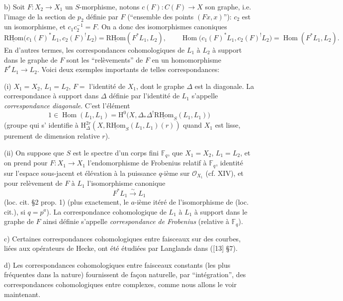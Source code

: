 \documentclass[11pt]{article}
\renewcommand{\H}{\mathrm{H}}
\DeclareMathOperator{\Hom}{Hom}
\newcommand{\R}{\mathrm{R}}\newcommand{\RHomCore}{\mathrm{RHom}}
\providecommand{\RHom}{\RHomCore}
\providecommand{\uRHom}{\underline{\RHom}}
\providecommand{\RHom}{\RHomCore}
\providecommand{\Hom}{\operatorname{Hom}}
\providecommand{\RHom}{\R\mathcal{H}om}
\providecommand{\R}{\mathrm R}
\providecommand{\RHom}{\RHomCore}
\providecommand{\Hom}{\operatorname{Hom}}
\begin{document}
b) Soit $F:X_2\to X_1$ un $S$-morphisme, notons $c(F):C(F)\to X$ son graphe, i.e. l'image de la section de $p_2$ définie par $F$ (``ensemble des points $(Fx,x)$''): $c_2$ est un isomorphisme, et $c_1c_2^{-1}=F$. On a donc des isomorphismes canoniques
\begin{equation}
\uRHom\bigl(c_1(F)^*L_1,c_2(F)^!L_2\bigr)=\uRHom(F^*L_1,L_2),
\qquad
\Hom\bigl(c_1(F)^*L_1,c_2(F)^!L_2\bigr)=\Hom(F^*L_1,L_2).
\tag{3.2.6}
\end{equation}
En d'autres termes, les correspondances cohomologiques de $L_1$ à $L_2$ à support dans le graphe de $F$ sont les ``relèvements'' de $F$ en un homomorphisme $F^*L_1\to L_2$. Voici deux exemples importants de telles correspondances:

(i) $X_1=X_2$, $L_1=L_2$, $F=$ l'identité de $X_1$, dont le graphe $\Delta$ est la diagonale. La correspondance à support dans $\Delta$ définie par l'identité de $L_1$ s'appelle \emph{correspondance diagonale}. C'est l'élément
\[
1\in \Hom(L_1,L_1)=\H^0\bigl(X,\Delta_*\Delta^!\uRHom_S(L_1,L_1)\bigr)
\]
(groupe qui s'%
identifie à 
$\H^{2r}_\Delta(X,\uRHom_S(L_1,L_1)(r))$ quand $X_1$ est lisse, purement de dimension relative $r$).

(ii) On suppose que $S$ est le spectre d'un corps fini $\mathbb F_q$, que $X_1=X_2$, $L_1=L_2$, et on prend pour $F:X_1\to X_1$ l'endomorphisme de Frobenius relatif à $\mathbb F_q$, identité sur l'espace sous-jacent et élévation à la puissance $q$-ième sur $\mathcal O_{X_1}$ (cf. XIV), et pour relèvement de $F$ à $L_1$ l'isomorphisme canonique
\[
F^*L_1\xrightarrow{\sim}L_1
\]
(loc. cit. §2 prop. 1) (plus exactement, le $a$-ième itéré de l'isomorphisme de (loc. cit.), si $q=p^a$). La correspondance cohomologique de $L_1$ à $L_1$ à support dans le graphe de $F$ ainsi définie s'appelle \emph{correspondance de Frobenius} (relative à $\mathbb F_q$).

c) Certaines correspondances cohomologiques entre faisceaux sur des courbes, liées aux opérateurs de Hecke, ont été étudiées par Langlands dans ([13] §7).

d) Les correspondances cohomologiques entre faisceaux constants (les plus fréquentes dans la nature) fournissent de façon naturelle, par ``intégration'', des correspondances cohomologiques entre complexes, comme nous allons le voir maintenant.
\end{document}

